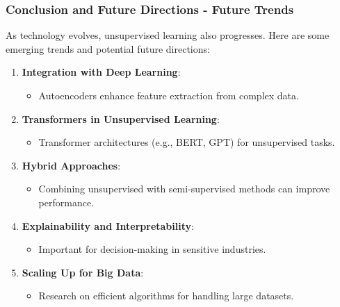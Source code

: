 \documentclass[aspectratio=169]{beamer}
\begin{document}
\begin{frame}[fragile]
    \frametitle{Conclusion and Future Directions - Future Trends}
    As technology evolves, unsupervised learning also progresses. Here are some emerging trends and potential future directions:
    
    \begin{enumerate}
        \item \textbf{Integration with Deep Learning}:
        \begin{itemize}
            \item Autoencoders enhance feature extraction from complex data.
        \end{itemize}
        
        \item \textbf{Transformers in Unsupervised Learning}:
        \begin{itemize}
            \item Transformer architectures (e.g., BERT, GPT) for unsupervised tasks.
        \end{itemize}
        
        \item \textbf{Hybrid Approaches}:
        \begin{itemize}
            \item Combining unsupervised with semi-supervised methods can improve performance.
        \end{itemize}
        
        \item \textbf{Explainability and Interpretability}:
        \begin{itemize}
            \item Important for decision-making in sensitive industries.
        \end{itemize}
        
        \item \textbf{Scaling Up for Big Data}:
        \begin{itemize}
            \item Research on efficient algorithms for handling large datasets.
        \end{itemize}
    \end{enumerate}
\end{frame}
\end{document}
